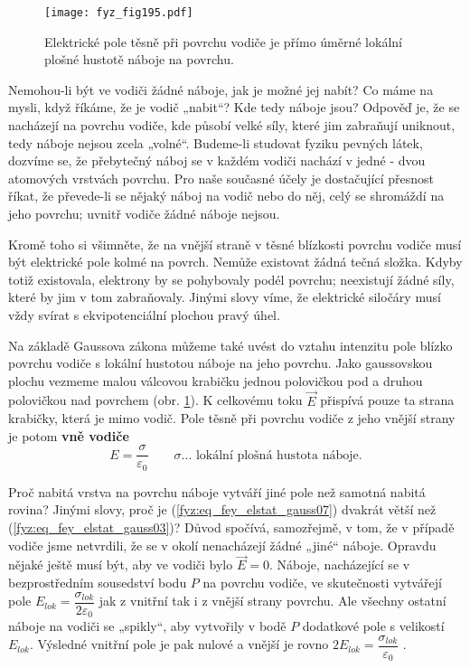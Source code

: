   \begin{figure}[ht!]  %
    \centering
    \texttt{[image: fyz\_fig195.pdf]}
    \caption{Elektrické pole těsně při povrchu vodiče je přímo úměrné lokální plošné hustotě  
             náboje na povrchu.}
    \label{fyz:fig195}
  \end{figure} 
  Nemohou-li být ve vodiči žádné náboje, jak je možné jej nabít? Co máme na mysli, když říkáme, 
  že je vodič „nabit“? Kde tedy náboje jsou? Odpověď je, že se nacházejí na povrchu vodiče, kde 
  působí velké síly, které jim zabraňují uniknout, tedy náboje nejsou zcela „volné“. Budeme-li 
  studovat fyziku pevných látek, dozvíme se, že přebytečný náboj se v každém vodiči nachází v 
  jedné - dvou atomových vrstvách povrchu. Pro naše současné účely je dostačující přesnost 
  říkat, že převede-li se nějaký náboj na vodič nebo do něj, celý se shromáždí na jeho povrchu; 
  uvnitř vodiče žádné náboje nejsou. 
  
  Kromě toho si všimněte, že na vnější straně v těsné blízkosti povrchu vodiče musí být 
  elektrické pole kolmé na povrch. Nemůže existovat žádná tečná složka. Kdyby totiž existovala, 
  elektrony by se pohybovaly podél povrchu; neexistují žádné síly, které by jim v tom 
  zabraňovaly. Jinými slovy víme, že elektrické siločáry musí vždy svírat s ekvipotenciální 
  plochou pravý úhel.
  
  Na základě Gaussova zákona můžeme také uvést do vztahu intenzitu pole blízko povrchu vodiče s 
  lokální hustotou náboje na jeho povrchu. Jako gaussovskou plochu vezmeme malou válcovou 
  krabičku jednou polovičkou pod a druhou polovičkou nad povrchem (obr. 
  \ref{fyz:fig195}). K celkovému toku \(\vec{E}\) přispívá pouze ta strana 
  krabičky, která je mimo vodič. Pole těsně při povrchu vodiče z jeho vnější strany je potom 
  \textbf{vně vodiče}
  \begin{equation}\label{fyz:eq_fey_elstat_gauss07}
    E = \frac{\sigma}{\varepsilon_0}  \qquad\text{\(\sigma\ldots\) lokální plošná hustota 
    náboje}.
  \end{equation}
  
  Proč nabitá vrstva na povrchu náboje vytváří jiné pole než samotná nabitá rovina? Jinými 
  slovy, proč je (\ref{fyz:eq_fey_elstat_gauss07}) dvakrát větší než 
  (\ref{fyz:eq_fey_elstat_gauss03})? Důvod spočívá, samozřejmě, v tom, že v případě vodiče jsme 
  netvrdili, že se v okolí nenacházejí žádné „jiné“ náboje. Opravdu nějaké ještě musí být, aby 
  ve vodiči bylo \(\vec{E} = 0\). Náboje, nacházející se v bezprostředním sousedství bodu \(P\) 
  na povrchu vodiče, ve skutečnosti vytvářejí pole \(E_{lok}= 
  \dfrac{\sigma_{lok}}{2\varepsilon_0}\) jak z vnitřní tak i z vnější strany povrchu. Ale 
  všechny ostatní náboje na vodiči se „spikly“, aby vytvořily v bodě \(P\) dodatkové pole s 
  velikostí \(E_{lok}\). Výsledné vnitřní pole je pak nulové a vnější je rovno \(2E_{lok} = 
  \dfrac{\sigma_{lok}}{\varepsilon_0}\) \cite[s.~93]{Feynman02}.
  
